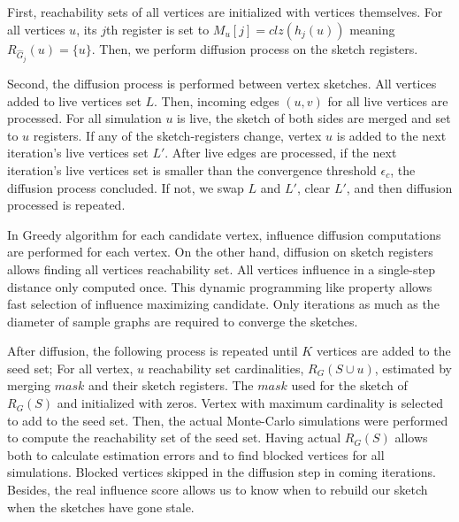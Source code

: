 \documentclass[10pt,journal,compsoc]{IEEEtran}
\begin{document}
First, reachability sets of all vertices are initialized with vertices themselves. For all vertices $u$, its $j$th register is set to $M_u[j]=clz(h_j(u))$ meaning $R_{\hat{G}_j}(u) = \{u\}$. Then, we perform diffusion process on the sketch registers. 

Second, the diffusion process is performed between vertex sketches. All vertices added to live vertices set $L$. Then, incoming edges $(u,v)$ for all live vertices are processed. For all simulation $u$ is live, the sketch of both sides are merged and set to $u$ registers. If any of the sketch-registers change, vertex $u$ is added to the next iteration's live vertices set $L'$. After live edges are processed, if the next iteration's live vertices set is smaller than the convergence threshold $\epsilon_c$, the diffusion process concluded. If not, we swap $L$ and $L'$, clear $L'$, and then diffusion processed is repeated. 

In Greedy algorithm\cite{kempe2003maximizing} for each candidate vertex, influence diffusion computations are performed for each vertex.  On the other hand, diffusion on sketch registers allows finding all vertices reachability set. All vertices influence in a single-step distance only computed once. This dynamic programming like property allows fast selection of influence maximizing candidate. Only iterations as much as the diameter of sample graphs are required to converge the sketches. 


After diffusion, the following process is repeated until $K$ vertices are added to the seed set; For all vertex, $u$ reachability set cardinalities, $R_G(S\cup u)$, estimated by merging $mask$ and their sketch registers. The $mask$ used for the sketch of $R_G(S)$ and initialized with zeros. Vertex with maximum cardinality is selected to add to the seed set. Then, the actual Monte-Carlo simulations were performed to compute the reachability set of the seed set. Having actual $R_G(S)$ allows both to calculate estimation errors and to find blocked vertices for all simulations. Blocked vertices skipped in the diffusion step in coming iterations. Besides, the real influence score allows us to know when to rebuild our sketch when the sketches have gone stale.
\end{document}
